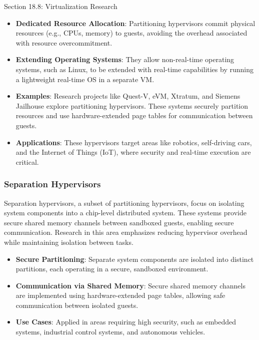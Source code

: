 \begin{notes}{Section 18.8: Virtualization Research}
\begin{highlight}
        \begin{itemize}
            \item \textbf{Dedicated Resource Allocation}: Partitioning hypervisors commit physical resources (e.g., CPUs, memory) to guests, avoiding the overhead associated with resource overcommitment.
            \item \textbf{Extending Operating Systems}: They allow non-real-time operating systems, such as Linux, to be extended with real-time capabilities by running a lightweight real-time OS in a separate VM.
            \item \textbf{Examples}: Research projects like Quest-V, eVM, Xtratum, and Siemens Jailhouse explore partitioning hypervisors. These systems securely partition resources and use hardware-extended 
            page tables for communication between guests.
            \item \textbf{Applications}: These hypervisors target areas like robotics, self-driving cars, and the Internet of Things (IoT), where security and real-time execution are critical.
        \end{itemize}
    
    \end{highlight}
    
    \subsubsection*{Separation Hypervisors}
    
    Separation hypervisors, a subset of partitioning hypervisors, focus on isolating system components into a chip-level distributed system. These systems provide secure shared memory channels between 
    sandboxed guests, enabling secure communication. Research in this area emphasizes reducing hypervisor overhead while maintaining isolation between tasks.
    
    \begin{highlight}
    
        \begin{itemize}
            \item \textbf{Secure Partitioning}: Separate system components are isolated into distinct partitions, each operating in a secure, sandboxed environment.
            \item \textbf{Communication via Shared Memory}: Secure shared memory channels are implemented using hardware-extended page tables, allowing safe communication between isolated guests.
            \item \textbf{Use Cases}: Applied in areas requiring high security, such as embedded systems, industrial control systems, and autonomous vehicles.
        \end{itemize}
    

\end{highlight}
\end{notes}
